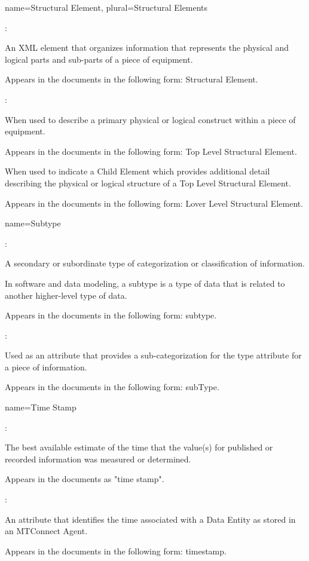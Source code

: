 {
  name={Structural Element},
  plural={Structural Elements}
}
{
	:

	An XML element that organizes information that represents the physical and logical parts and sub-parts of a piece of equipment.

	Appears in the documents in the following form: Structural Element.

	:

	When used to describe a primary physical or logical construct within a piece of equipment. 

	Appears in the documents in the following form: Top Level Structural Element.

	When used to indicate a Child Element which provides additional detail describing the physical or logical structure of a Top Level Structural Element.

	Appears in the documents in the following form: Lover Level Structural Element.
}


{
  name={Subtype}
}
{
	:

	A secondary or subordinate type of categorization or classification of information.

	In software and data modeling, a subtype is a type of data that is related to another higher-level type of data.

	Appears in the documents in the following form: subtype.

	:

	Used as an attribute that provides a sub-categorization for the type attribute for a piece of information.

	Appears in the documents in the following form: subType.
}


{
  name={Time Stamp}
}
{
	:

	The best available estimate of the time that the value(s) for published or recorded information was measured or determined.

	Appears in the documents as "time stamp".

	:

	An attribute that identifies the time associated with a Data Entity as stored in an MTConnect Agent.

	Appears in the documents in the following form: timestamp.
}


